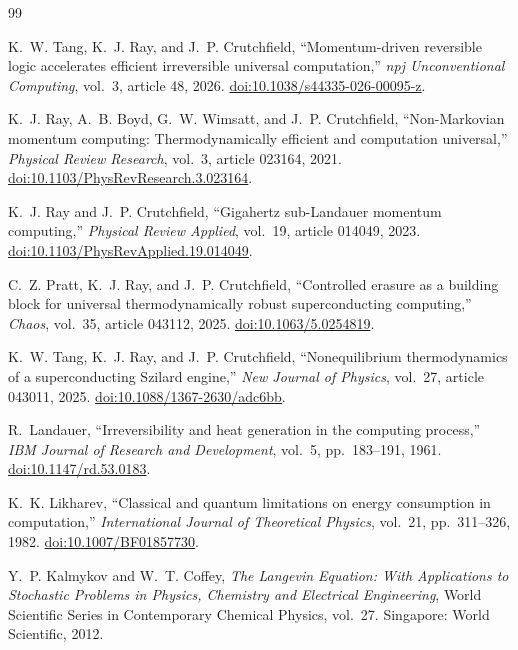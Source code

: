 \documentclass[11pt]{article}
\begin{document}
\begin{thebibliography}{99}

K.~W. Tang, K.~J. Ray, and J.~P. Crutchfield,
``Momentum-driven reversible logic accelerates efficient irreversible
universal computation,''
\emph{npj Unconventional Computing}, vol.~3, article 48, 2026.
\href{https://doi.org/10.1038/s44335-026-00095-z}
{doi:10.1038/s44335-026-00095-z}.

K.~J. Ray, A.~B. Boyd, G.~W. Wimsatt, and J.~P. Crutchfield,
``Non-Markovian momentum computing: Thermodynamically efficient and
computation universal,''
\emph{Physical Review Research}, vol.~3, article 023164, 2021.
\href{https://doi.org/10.1103/PhysRevResearch.3.023164}
{doi:10.1103/PhysRevResearch.3.023164}.

K.~J. Ray and J.~P. Crutchfield,
``Gigahertz sub-Landauer momentum computing,''
\emph{Physical Review Applied}, vol.~19, article 014049, 2023.
\href{https://doi.org/10.1103/PhysRevApplied.19.014049}
{doi:10.1103/PhysRevApplied.19.014049}.

C.~Z. Pratt, K.~J. Ray, and J.~P. Crutchfield,
``Controlled erasure as a building block for universal thermodynamically
robust superconducting computing,''
\emph{Chaos}, vol.~35, article 043112, 2025.
\href{https://doi.org/10.1063/5.0254819}
{doi:10.1063/5.0254819}.

K.~W. Tang, K.~J. Ray, and J.~P. Crutchfield,
``Nonequilibrium thermodynamics of a superconducting Szilard engine,''
\emph{New Journal of Physics}, vol.~27, article 043011, 2025.
\href{https://doi.org/10.1088/1367-2630/adc6bb}
{doi:10.1088/1367-2630/adc6bb}.

R.~Landauer,
``Irreversibility and heat generation in the computing process,''
\emph{IBM Journal of Research and Development}, vol.~5,
pp.~183--191, 1961.
\href{https://doi.org/10.1147/rd.53.0183}
{doi:10.1147/rd.53.0183}.

K.~K. Likharev,
``Classical and quantum limitations on energy consumption in computation,''
\emph{International Journal of Theoretical Physics}, vol.~21,
pp.~311--326, 1982.
\href{https://doi.org/10.1007/BF01857730}
{doi:10.1007/BF01857730}.

Y.~P. Kalmykov and W.~T. Coffey,
\emph{The Langevin Equation: With Applications to Stochastic Problems in
Physics, Chemistry and Electrical Engineering},
World Scientific Series in Contemporary Chemical Physics, vol.~27.
Singapore: World Scientific, 2012.


\end{thebibliography}
\end{document}
